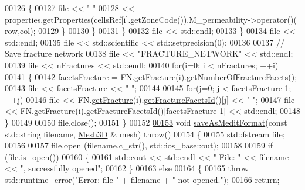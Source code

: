 \begin{DoxyCode}
00126                 \{
00127                     file << \textcolor{stringliteral}{" "}
00128                          << properties.getProperties(cellsRef[i].getZoneCode()).M\_permeability->operator()(
      row,col);
00129                 \}
00130             \}
00131         \}
00132         file << std::endl;
00133     \}
00134     file << std::endl;
00135     file << std::scientific << std::setprecision(0);
00136 
00137     \textcolor{comment}{// Save fracture network}
00138     file << \textcolor{stringliteral}{"FRACTURE\_NETWORK"} << std::endl;
00139     file << nFractures << std::endl;
00140     \textcolor{keywordflow}{for}(i=0; i < nFractures; ++i)
00141     \{
00142         facetsFracture = FN.\hyperlink{classFVCode3D_1_1FractureNetwork3D_aef2f83259eaeb30eb24c6fdb3f3c0753}{getFracture}(i).\hyperlink{classFVCode3D_1_1Fracture3D_ad4591d70b2481c683707038ab0e870c9}{getNumberOfFractureFacets}();
00143         file << facetsFracture << \textcolor{stringliteral}{" "};
00144 
00145         \textcolor{keywordflow}{for}(j=0; j < facetsFracture-1; ++j)
00146             file << FN.\hyperlink{classFVCode3D_1_1FractureNetwork3D_aef2f83259eaeb30eb24c6fdb3f3c0753}{getFracture}(i).\hyperlink{classFVCode3D_1_1Fracture3D_af63aa07d454891f7edaa087ade1c2135}{getFractureFacetsId}()[j] << \textcolor{stringliteral}{" "};
00147         file << FN.\hyperlink{classFVCode3D_1_1FractureNetwork3D_aef2f83259eaeb30eb24c6fdb3f3c0753}{getFracture}(i).\hyperlink{classFVCode3D_1_1Fracture3D_af63aa07d454891f7edaa087ade1c2135}{getFractureFacetsId}()[facetsFracture-1] << 
      std::endl;
00148     \}
00149 
00150     file.close();
00151 \}
00152 
\hypertarget{Converter_8cpp_source.tex_l00153}{}\hyperlink{namespaceFVCode3D_a309feff3c4ef28a971e23350d895579c}{00153} \textcolor{keywordtype}{void} \hyperlink{namespaceFVCode3D_a309feff3c4ef28a971e23350d895579c}{saveAsMeditFormat}(\textcolor{keyword}{const} std::string filename, \hyperlink{classFVCode3D_1_1Mesh3D}{Mesh3D} & mesh) \textcolor{keywordflow}{throw}()
00154 \{
00155     std::fstream file;
00156 
00157     file.open (filename.c\_str(), std::ios\_base::out);
00158 
00159     \textcolor{keywordflow}{if} (file.is\_open())
00160     \{
00161         std::cout << std::endl << \textcolor{stringliteral}{" File: "} << filename << \textcolor{stringliteral}{", successfully opened"};
00162     \}
00163     \textcolor{keywordflow}{else}
00164     \{
00165         \textcolor{keywordflow}{throw} std::runtime\_error(\textcolor{stringliteral}{"Error: file "} + filename + \textcolor{stringliteral}{" not opened."});
00166         \textcolor{keywordflow}{return};

\end{DoxyCode}
